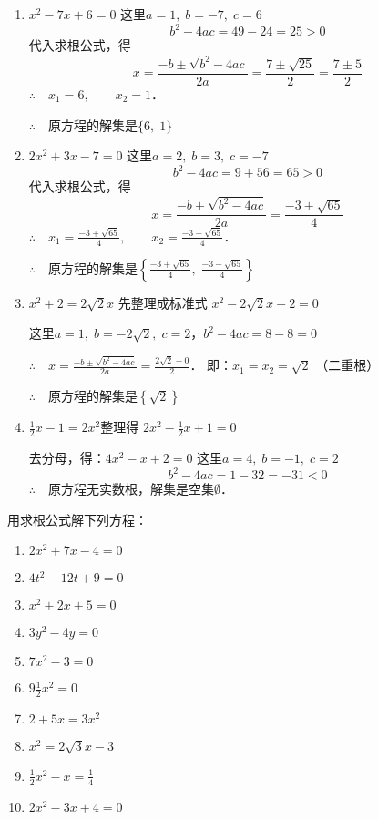 \begin{solution}
\begin{enumerate}
    \item  $x^2-7x+6=0$ 这里$a=1,\; b=-7,\; c=6$
\[b^2-4ac=49-24=25>0\]
代入求根公式，得
\[x=\frac{-b\pm\sqrt{b^2-4ac}}{2a}=\frac{7\pm\sqrt{25}}{2}=\frac{7\pm 5}{2} \]
$\therefore\quad x_1=6,\qquad x_2=1$．

$\therefore\quad $原方程的解集是$\{6,\; 1\}$

\item $2x^2+3x-7=0$ 这里$a=2,\; b=3,\; c=-7$
\[b^2-4ac=9+56=65>0\]
代入求根公式，得
\[x=\frac{-b\pm\sqrt{b^2-4ac}}{2a}=\frac{-3\pm\sqrt{65}}{4} \]
$\therefore\quad x_1=\frac{-3+\sqrt{65}}{4},\qquad x_2=\frac{-3-\sqrt{65}}{4}$．

$\therefore\quad $原方程的解集是$\left\{\frac{-3+\sqrt{65}}{4},\; \frac{-3-\sqrt{65}}{4}\right\}$

\item $x^2+2=2\sqrt{2}x$ 先整理成标准式 $x^2-2\sqrt{2}x+2=0$

这里$a=1,\; b=-2\sqrt{2},\; c=2$，$b^2-4ac=8-8=0$

$\therefore\quad x=\frac{-b\pm\sqrt{b^2-4ac}}{2a}=\frac{2\sqrt{2}\pm 0}{2}$．
即：$x_1=x_2=\sqrt{2}$ （二重根）

$\therefore\quad $原方程的解集是$\left\{\sqrt{2}\right\}$

\item $\frac{1}{2}x-1=2x^2$整理得  $2x^2-\frac{1}{2}x+1=0$

去分母，得：$4x^2-x+2=0$ 这里$a=4,\; b=-1,\; c=2$
\[b^2-4ac=1-32=-31<0\]
$\therefore\quad $原方程无实数根，解集是空集$\emptyset$．
\end{enumerate}    
\end{solution}

\begin{ex}
    用求根公式解下列方程：
    \begin{multicols}{2}
 \begin{enumerate}
    \item $2 x^{2}+7 x-4=0$
\item $4 t^{2}-12 t+9=0$
\item $x^{2}+2 x+5=0$
\item  $3 y^{2}-4 y=0$
\item  $7 x^{2}-3=0$
\item $9 \frac{1}{2} x^{2}=0$
\item  $2+5 x=3 x^{2}$
\item  $x^{2}=2 \sqrt{3} x-3$
\item  $\frac{1}{2} x^{2}-x=\frac{1}{4}$
\item $2 x^{2}-3 x+4=0$
\end{enumerate}       
    \end{multicols}

\end{ex}



